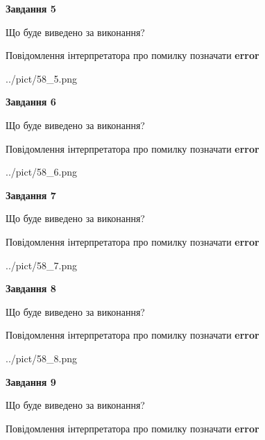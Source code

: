 \documentclass[11pt, ukrainian]{article}
\begin{document}
{\begin {large}
{\begin {center}\textbf{Завдання 5}\end {center}}\par
Що буде виведено за виконання? \par
Повідомлення інтерпретатора про помилку позначати \textbf{error}

\begin{center}
	{../pict/58_5.png}
\end{center}
\newpage

{\begin {center}\textbf{Завдання 6}\end {center}}\par
Що буде виведено за виконання? \par
Повідомлення інтерпретатора про помилку позначати \textbf{error}

\begin{center}
	{../pict/58_6.png}
\end{center}
\newpage

{\begin {center}\textbf{Завдання 7}\end {center}}\par
Що буде виведено за виконання? \par
Повідомлення інтерпретатора про помилку позначати \textbf{error}

\begin{center}
	{../pict/58_7.png}
\end{center}
\newpage

{\begin {center}\textbf{Завдання 8}\end {center}}\par
Що буде виведено за виконання? \par
Повідомлення інтерпретатора про помилку позначати \textbf{error}

\begin{center}
	{../pict/58_8.png}
\end{center}
\newpage

{\begin {center}\textbf{Завдання 9}\end {center}}\par
Що буде виведено за виконання? \par
Повідомлення інтерпретатора про помилку позначати \textbf{error}


\end{large}}
\end{document}
